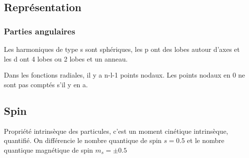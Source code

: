 \documentclass[french]{yLectureNote}
\begin{document}
\subsection{Représentation}
\subsubsection{Parties angulaires}
Les harmoniques de type s sont sphériques, les p ont des lobes autour d'axes et les d ont 4 lobes ou 2 lobes et un anneau.
\begin{theorem}
 Dans les fonctions radiales, il y a n-l-1 points nodaux. Les points nodaux en 0 ne sont pas comptés s'il y en a.
\end{theorem}
\subsection{Spin}
\begin{definition}[Spin]
Propriété intrinsèque des particules, c'est un moment cinétique intrinsèque, quantifié. On différencie le nombre quantique de spin \(s = 0.5\) et le nombre quantique magnétique de spin \(m_s = \pm 0.5\)
\end{definition}
 
\end{document}
